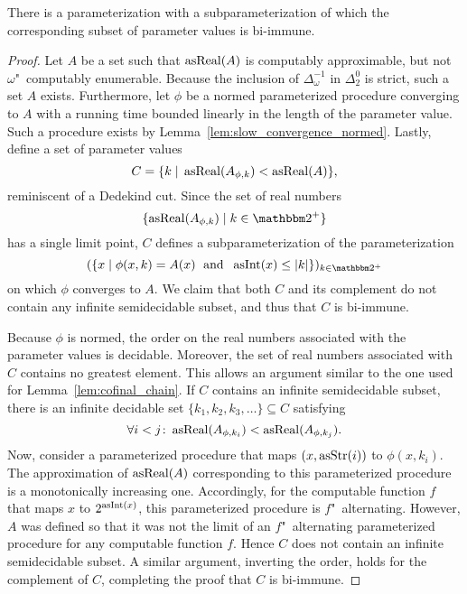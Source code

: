 \begin{lemma}
\label{lem:subparameterization_bi-immune}%
  There is a parameterization with a subparameterization of which the corresponding subset of parameter values is bi-immune.
\end{lemma}
\begin{proof}
  Let $A$ be a set such that $\operatorname{asReal}(A)$ is computably approximable, but not $\omega$"~computably enumerable.
  Because the inclusion of $\Delta^{-1}_\omega$ in $\Delta^0_2$ is strict, such a set $A$ exists.
  Furthermore, let $\phi$ be a normed parameterized procedure converging to $A$ with a running time bounded linearly in the length of the parameter value.
  Such a procedure exists by Lemma~\ref{lem:slow_convergence_normed}.
  Lastly, define a set of parameter values
  \begin{equation*}
    C = \{k \;|\; \operatorname{asReal}(A_{\phi,k}) < \operatorname{asReal}(A)\},
  \end{equation*}
  reminiscent of a Dedekind cut.
  Since the set of real numbers
  \begin{equation*}
    \{\asReal(A_{\phi, k}) \st k \in \binary^+\}
  \end{equation*}
  has a single limit point, $C$ defines a subparameterization of the parameterization
  \begin{equation*}
    (\{x \st \phi(x, k) = A(x) \reland \asNat(x) \le \length{k}\})_{k \in \binary^+}
  \end{equation*}
  on which $\phi$ converges to $A$.
  We claim that both $C$ and its complement do not contain any infinite semidecidable subset, and thus that $C$ is bi-immune.

  Because $\phi$ is normed, the order on the real numbers associated with the parameter values is decidable.
  Moreover, the set of real numbers associated with $C$ contains no greatest element.
  This allows an argument similar to the one used for Lemma~\ref{lem:cofinal_chain}.
  If $C$ contains an infinite semidecidable subset, there is an infinite decidable set $\{k_1, k_2, k_3, \ldots\} \subseteq C$ satisfying
  \begin{equation*}
    \forall i < j\colon \operatorname{asReal}(A_{\phi, k_i}) < \operatorname{asReal}(A_{\phi, k_j}).
  \end{equation*}
  Now, consider a parameterized procedure that maps $(x, \operatorname{asStr}(i))$ to $\phi(x, k_i)$.
  The approximation of $\operatorname{asReal}(A)$ corresponding to this parameterized procedure is a monotonically increasing one.
  Accordingly, for the computable function $f$ that maps $x$ to $2^{\operatorname{asInt}(x)}$, this parameterized procedure is $f$"~alternating.
  However, $A$ was defined so that it was not the limit of an $f$"~alternating parameterized procedure for any computable function $f$.
  Hence $C$ does not contain an infinite semidecidable subset.
  A similar argument, inverting the order, holds for the complement of $C$, completing the proof that $C$ is bi-immune.
\end{proof}

